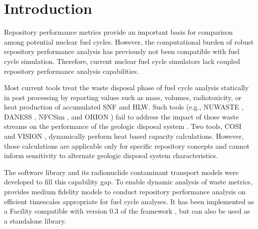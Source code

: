 \section{Introduction}\label{sec:introduction}
Repository performance metrics provide an important basis for comparison among 
potential nuclear fuel cycles. 
However, the computational 
burden of robust repository performance analysis has previously not been 
compatible with fuel cycle simulation.
Therefore, current nuclear fuel cycle simulators 
lack coupled repository performance analysis capabilities.  

Most current tools treat the waste disposal
phase of fuel cycle analysis statically in post processing by reporting
values such as mass, volumes, radiotoxicity, or heat production of accumulated
\gls{SNF} and \gls{HLW}. Such tools
(e.g.,
\gls{NUWASTE} \cite{abkowitz_nuclear_2010},
\gls{DANESS} \cite{van_den_durpel_daness:_2006},
\gls{NFCSim} \cite{schneider_nfcsim_2004}, and
ORION \cite{gregg_orion_2011})
fail to address the impact of those waste streams on the performance of the
geologic disposal system \cite{wilson_comparing_2011}.  Two tools, \gls{COSI}
\cite{boucher_international_2010} and \gls{VISION} \cite{yacout_vision_2006,
wilson_comparing_2011, radel_repository_2007, boucher_international_2010},
dynamically perform heat based capacity calculations.
However, those calculations are applicable only for specific
repository concepts and cannot inform sensitivity to alternate geologic disposal
system characteristics.

The \Cyder software library \cite{huff_cyder_2013} and its radionuclide 
contaminant transport models were  developed to fill this capability gap.  To 
enable dynamic analysis of waste metrics, \Cyder provides medium fidelity 
models to conduct repository performance analysis on efficient timescales 
appropriate for fuel cycle analyses. It has been implemented as a Facility 
compatible with version 0.3 of the \Cyclus framework \cite{wilson_cyclus:_2012}, but can 
also be used as a standalone library.

